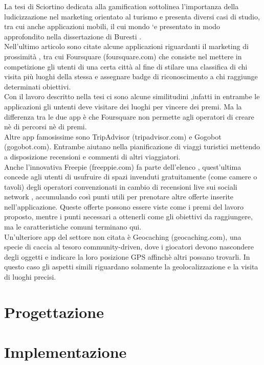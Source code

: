 La tesi di Sciortino dedicata alla gamification \cite{rif5} sottolinea l’importanza della ludicizzazione nel marketing orientato al turismo e presenta diversi casi di studio, tra
cui anche applicazioni mobili, il cui mondo `e presentato in modo approfondito nella dissertazione di Buresti \cite{rif7}.\\
Nell'ultimo articolo sono citate alcune applicazioni riguardanti il marketing di prossimità , tra cui Foursquare (foursquare.com) che consiste nel mettere in competizione gli utenti di una certa città al fine di stilare una classifica di chi visita più luoghi della stessa e assegnare badge di riconoscimento a chi raggiunge determinati obiettivi.\\
Con il lavoro descritto nella tesi ci sono alcune similitudini ,infatti in entrambe le applicazioni gli untenti deve visitare dei luoghi per vincere dei premi. 
Ma la differenza tra le due app è che Foursquare non permette agli operatori di creare nè di percorsi nè di premi.\\
Altre app famosissime sono TripAdvisor (tripadvisor.com) e Gogobot (gogobot.com). Entrambe aiutano nella pianificazione di viaggi turistici mettendo a disposizione recensioni e commenti di altri viaggiatori.\\
Anche l'innovativa Freepie (freeppie.com) fa parte dell'elenco , quest'ultima concede agli utenti di usufruire di spazi invenduti gratuitamente (come camere o tavoli) degli operatori convenzionati in cambio di recensioni live sui sociali network , accumulando così punti utili per prenotare altre offerte inserite nell'applicazione.
Queste offerte possono essere viste come i premi del lavoro proposto, mentre i punti necessari a ottenerli come gli obiettivi da raggiungere, ma le caratteristiche comuni terminano qui.\\
Un’ulteriore app del settore non citata è Geocaching (geocaching.com), una specie di caccia al tesoro community-driven, dove i giocatori devono nascondere degli oggetti e indicare la loro posizione GPS affinchè altri possano trovarli.
In questo caso gli aspetti simili riguardano solamente la geolocalizzazione e la visita di luoghi precisi.
\chapter{Progettazione}

\chapter{Implementazione}

